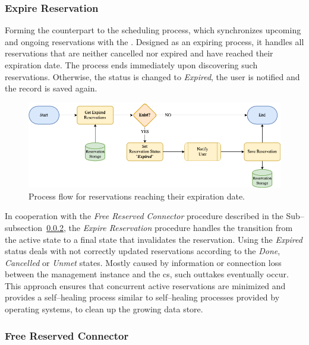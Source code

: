 \subsubsection{Expire Reservation}
\label{ch:Design:sec:Reservation System:ssec:Scheduling Capabilities:sssec:Expire Reservation}

Forming the counterpart to the scheduling process, which synchronizes upcoming and ongoing reservations with the . Designed as an expiring process, it handles all reservations that are neither cancelled nor expired and have reached their expiration date.
The process ends immediately upon discovering such reservations. Otherwise, the status is changed to \textit{Expired}, the user is notified and the record is saved again.

\begin{figure}[h]
    \centering
    \includegraphics[scale=0.4]{resources/images/main/5_design/processes/scheduler/UpdateExpiredReservations.png}
    \caption{Process flow for reservations reaching their expiration date.}
    \label{fig:expire-reservation-flowchart}
\end{figure}

\noindent In cooperation with the \textit{Free Reserved Connector} procedure described in the Sub--subsection~\ref{ch:Design:sec:Reservation System:ssec:Scheduling Capabilities:sssec:Free Reserved Connector}, the \textit{Expire Reservation} procedure handles the transition from the active state to a final state that invalidates the reservation.
Using the \textit{Expired} status deals with not correctly updated reservations according to the \textit{Done}, \textit{Cancelled} or \textit{Unmet} states. 
Mostly caused by information or connection loss between the management instance and the \acrshort{cs}, such outtakes eventually occur.
This approach ensures that concurrent active reservations are minimized and provides a self--healing process similar to self--healing processes provided by operating systems, to clean up the growing data store.

\subsubsection{Free Reserved Connector}
\label{ch:Design:sec:Reservation System:ssec:Scheduling Capabilities:sssec:Free Reserved Connector}

